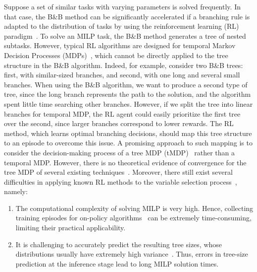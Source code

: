 \documentclass[preprint,12pt]{elsarticle} %
\theoremstyle{plain}
\theoremstyle{definition}
\theoremstyle{remark}
\begin{document}
Suppose a set of similar tasks with varying parameters is solved frequently. In that case, the B\&B method can be significantly accelerated if a branching rule is adapted to the distribution of tasks by using the reinforcement learning (RL) paradigm~\cite{etheve_2020,mazyavkina2021reinforcement,scavuzzo_2022, parsonson}. %
To solve an MILP task, the B\&B method generates a tree of nested subtasks. However, typical RL algorithms are designed for temporal Markov Decision Processes (MDPs)~\cite{sutton2018reinforcement}, which cannot be directly applied to the tree structure in the B\&B algorithm. 
Indeed, for example, consider two B\&B trees: first, with similar-sized branches, and second, with one long and several small branches. When using the B\&B algorithm, we want to produce a second type of tree, since the long branch represents the path to the solution, and the algorithm spent little time searching other branches. However, if we split the tree into linear branches for temporal MDP, the RL agent could easily prioritize the first tree over the second, since larger branches correspond to lower rewards. The RL method, which learns optimal branching decisions, should map this tree structure to an episode to overcome this issue. A promising approach to such mapping is to consider the decision-making process of a tree MDP (tMDP)~\cite{scavuzzo_2022} rather than a temporal MDP. However, there is no theoretical evidence of convergence for the tree MDP of several existing techniques~\cite{etheve_2020, parsonson}. Moreover, there still exist several difficulties in applying known RL methods to the variable selection process~\cite{etheve_2020,scavuzzo_2022}, namely: 
\begin{enumerate}
\item The computational complexity of solving MILP is very high. Hence, collecting training episodes for on-policy algorithms~\cite{scavuzzo_2022} can be extremely time-consuming, limiting their practical applicability.  
\item It is challenging to accurately predict the resulting tree sizes, whose distributions usually have extremely high variance~\cite{etheve_2020}. Thus, errors in tree-size prediction at the inference stage lead to long MILP solution times. 
\end{enumerate}
\end{document}
